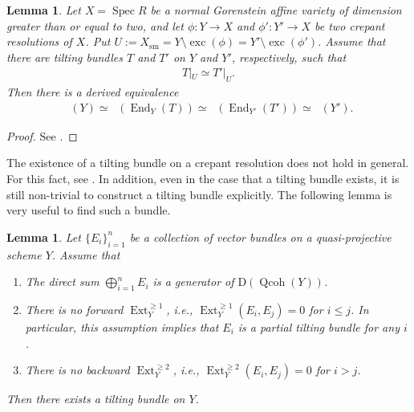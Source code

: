 \documentclass[10pt,a4paper]{amsart}
\DeclareMathOperator{\D}{D^b}
\DeclareMathOperator{\End}{End}
\DeclareMathOperator{\exc}{exc}
\DeclareMathOperator{\Ext}{Ext}
\DeclareMathOperator{\Qcoh}{Qcoh}
\DeclareMathOperator{\Spec}{Spec}
\numberwithin{equation}{section}
\newtheorem{Lemma}[Theorem]{Lemma}
\begin{document}
\begin{Lemma} \label{lem tilting equivalence flop}
Let $X = \Spec R$ be a normal Gorenstein affine variety of dimension greater than or equal to two,
and let $\phi\colon Y \to X$ and $\phi'\colon Y' \to X$ be two crepant resolutions of $X$.
Put $U := X_{\mathrm{sm}} = Y \setminus \exc(\phi) = Y' \setminus \exc(\phi')$.
Assume that there are tilting bundles $T$ and $T'$ on $Y$ and $Y'$, respectively, such that
\begin{gather*}
T|_U \simeq T'|_U.
\end{gather*}
Then there is a derived equivalence
\begin{gather*}
\D(Y) \simeq \D(\End_Y(T)) \simeq \D(\End_{Y'}(T')) \simeq \D(Y').
\end{gather*}
\end{Lemma}

\begin{proof}See \cite[Lemma 3.4]{H17c}.
\end{proof}

The existence of a tilting bundle on a crepant resolution does not hold in general.
For this fact, see \cite[Theorem 4.20]{IW14b}.
In addition, even in the case that a tilting bundle exists, it is still non-trivial to construct a tilting bundle explicitly.
The following lemma is very useful to find such a bundle.

\begin{Lemma} \label{lem prelim tilting semiuniv}
Let $\{ E_i \}_{i=1}^n$ be a collection of vector bundles on a quasi-projective scheme $Y$.
Assume that
\begin{enumerate}\itemsep=0pt
\item[$(i)$] The direct sum $\bigoplus_{i=1}^n E_i$ is a generator of $\mathrm{D}(\Qcoh(Y))$.
\item[$(ii)$] There is no forward $\Ext^{\geq 1}_Y$, i.e., $\Ext_Y^{\geq 1}(E_i, E_j) = 0$ for $i \leq j$.
In particular, this assumption implies that $E_i$ is a partial tilting bundle for any $i$.
\item[$(iii)$] There is no backward $\Ext^{\geq 2}_Y$, i.e., $\Ext_Y^{\geq 2}(E_i, E_j) = 0$ for $i > j$.
\end{enumerate}
Then there exists a tilting bundle on $Y$.
\end{Lemma}
\end{document}
